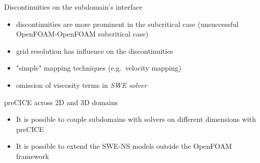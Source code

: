 
\begin{frame}
\vspace{1cm}
\begin{block}{Discontinuities on the subdomain's interface}
\begin{itemize}
\item discontinuities are more prominent in the subcritical case (unsuccessful OpenFOAM-OpenFOAM subcritical case)
\item grid resolution has influence on the discontinuities
\item "simple" mapping techniques (e.g.~velocity mapping)
\item omission of viscosity terms in \textit{SWE solver}
\end{itemize}
\end{block}
\vspace{1cm}
\begin{block}{preCICE across 2D and 3D domains}
\begin{itemize}
\item It is possible to couple subdomains with solvers on different dimensions with preCICE
\item It is possible to extend the SWE-NS models outside the OpenFOAM framework
\end{itemize}

\end{block}


\end{frame}




%
%
%
%

